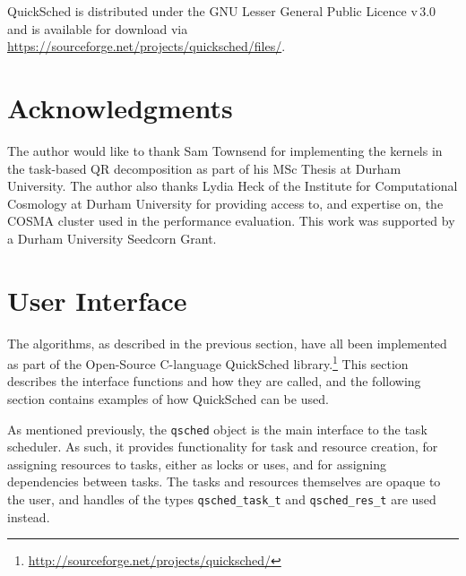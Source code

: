 \documentclass[preprint]{elsarticle}
\begin{document}
QuickSched is distributed under the GNU Lesser General Public Licence
v\,3.0 and is available for download via
\url{https://sourceforge.net/projects/quicksched/files/}.


\section*{Acknowledgments}
The author would like to thank Sam Townsend for implementing the
kernels in the task-based QR decomposition as part of his MSc Thesis
at Durham University.
The author also thanks Lydia Heck of the Institute for
Computational Cosmology at Durham University for providing access
to, and expertise on, the COSMA cluster used in the performance
evaluation.
This work was supported by a Durham University Seedcorn Grant.






\appendix
\section{User Interface}

The algorithms, as described in the previous section, have
all been implemented as part of the Open-Source C-language
QuickSched library.\footnote{\url{http://sourceforge.net/projects/quicksched/}}
This section describes the interface functions and how they
are called, and the following section contains
examples of how QuickSched can be used.

As mentioned previously, the {\tt qsched} object is the main
interface to the task scheduler.
As such, it provides functionality for task and resource
creation, for assigning resources to tasks, either as locks
or uses, and for assigning dependencies between tasks.
The tasks and resources themselves are opaque to the
user, and handles of the types {\tt qsched\_task\_t}
and {\tt qsched\_res\_t} are used instead.
\end{document}
